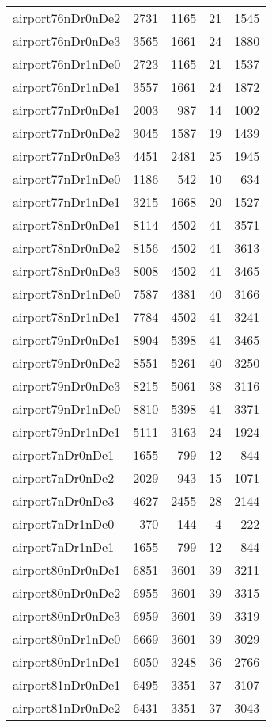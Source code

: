 \begin{longtable}{lrrrr}
airport76nDr0nDe2 & 2731 & 1165 & 21 & 1545 \\
airport76nDr0nDe3 & 3565 & 1661 & 24 & 1880 \\
airport76nDr1nDe0 & 2723 & 1165 & 21 & 1537 \\
airport76nDr1nDe1 & 3557 & 1661 & 24 & 1872 \\
airport77nDr0nDe1 & 2003 & 987 & 14 & 1002 \\
airport77nDr0nDe2 & 3045 & 1587 & 19 & 1439 \\
airport77nDr0nDe3 & 4451 & 2481 & 25 & 1945 \\
airport77nDr1nDe0 & 1186 & 542 & 10 & 634 \\
airport77nDr1nDe1 & 3215 & 1668 & 20 & 1527 \\
airport78nDr0nDe1 & 8114 & 4502 & 41 & 3571 \\
airport78nDr0nDe2 & 8156 & 4502 & 41 & 3613 \\
airport78nDr0nDe3 & 8008 & 4502 & 41 & 3465 \\
airport78nDr1nDe0 & 7587 & 4381 & 40 & 3166 \\
airport78nDr1nDe1 & 7784 & 4502 & 41 & 3241 \\
airport79nDr0nDe1 & 8904 & 5398 & 41 & 3465 \\
airport79nDr0nDe2 & 8551 & 5261 & 40 & 3250 \\
airport79nDr0nDe3 & 8215 & 5061 & 38 & 3116 \\
airport79nDr1nDe0 & 8810 & 5398 & 41 & 3371 \\
airport79nDr1nDe1 & 5111 & 3163 & 24 & 1924 \\
airport7nDr0nDe1 & 1655 & 799 & 12 & 844 \\
airport7nDr0nDe2 & 2029 & 943 & 15 & 1071 \\
airport7nDr0nDe3 & 4627 & 2455 & 28 & 2144 \\
airport7nDr1nDe0 & 370 & 144 & 4 & 222 \\
airport7nDr1nDe1 & 1655 & 799 & 12 & 844 \\
airport80nDr0nDe1 & 6851 & 3601 & 39 & 3211 \\
airport80nDr0nDe2 & 6955 & 3601 & 39 & 3315 \\
airport80nDr0nDe3 & 6959 & 3601 & 39 & 3319 \\
airport80nDr1nDe0 & 6669 & 3601 & 39 & 3029 \\
airport80nDr1nDe1 & 6050 & 3248 & 36 & 2766 \\
airport81nDr0nDe1 & 6495 & 3351 & 37 & 3107 \\
airport81nDr0nDe2 & 6431 & 3351 & 37 & 3043 \\

\end{longtable}
